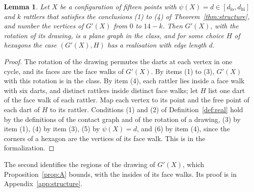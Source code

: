\documentclass[12pt]{amsart}
\newtheorem{lemma}[theorem]{Lemma}
\theoremstyle{definition}
\theoremstyle{plain}
\theoremstyle{definition}
\newcommand{\dlo}{d_{\mathrm{lo}}}
\newcommand{\dhi}{d_{\mathrm{hi}}}
\newcommand{\leanmap}[1]{\ignorespaces}
\newcommand{\mapnote}[1]{\ignorespaces}
\begin{document}
\begin{lemma}\label{lem:realise}\leanmap{Tammes15.realisation_of_structured, Tammes15.Structured}\mapnote{for fifteen points at pairwise distance at least $d$, with the contact graph at distance $d$ and the conclusions (1) to (4) of Theorem \ref{thm:structure} in the form of the second declaration}
Let $X$ be a configuration of fifteen points with $\psi(X)=d\in[\dlo,\dhi]$ and $k$ rattlers that satisfies the conclusions (1) to (4) of Theorem~\ref{thm:structure}, and number the vertices of $G'(X)$ from $0$ to $14-k$. Then $G'(X)$, with the rotation of its drawing, is a plane graph in the class, and for some choice $H$ of hexagons the case $(G'(X),H)$ has a realisation with edge length $d$.
\end{lemma}

\begin{proof}
The rotation of the drawing permutes the darts at each vertex in one cycle, and its faces are the face walks of $G'(X)$. By items (1) to (3), $G'(X)$ with this rotation is in the class. By item (4), each rattler lies inside a face walk with six darts, and distinct rattlers inside distinct face walks; let $H$ list one dart of the face walk of each rattler. Map each vertex to its point and the free point of each dart of $H$ to its rattler. Conditions (1) and (2) of Definition~\ref{def:real} hold by the definitions of the contact graph and of the rotation of a drawing, (3) by item (1), (4) by item (3), (5) by $\psi(X)=d$, and (6) by item (4), since the corners of a hexagon are the vertices of its face walk. This is  in the formalization.
\end{proof}

The second identifies the regions of the drawing of $G'(X)$, which Proposition~\ref{prop:A} bounds, with the insides of its face walks. Its proof is in Appendix~\ref{app:structure}.
\end{document}
